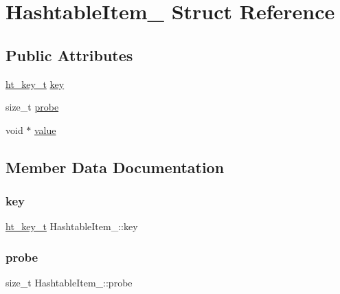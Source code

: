 \hypertarget{structHashtableItem__}{}\section{Hashtable\+Item\+\_\+ Struct Reference}
\label{structHashtableItem__}
\subsection*{Public Attributes}
\begin{DoxyCompactItemize}
\item 
\hyperlink{Hashtable_8h_ac88d0518f664d4d4d74b5a1aa3453de3}{ht\+\_\+key\+\_\+t} \hyperlink{structHashtableItem___a432a2f1c644bb64e759db481280c3f1e}{key}
\item 
size\+\_\+t \hyperlink{structHashtableItem___a35911ac576cf15c4a49f93acf4b38763}{probe}
\item 
void $\ast$ \hyperlink{structHashtableItem___a986e8fbd4a7b4de6c81d0593c6ea39f2}{value}
\end{DoxyCompactItemize}


\subsection{Member Data Documentation}
\mbox{\label{structHashtableItem___a432a2f1c644bb64e759db481280c3f1e}} 
\subsubsection{\texorpdfstring{key}{key}}
{\footnotesize\ttfamily \hyperlink{Hashtable_8h_ac88d0518f664d4d4d74b5a1aa3453de3}{ht\+\_\+key\+\_\+t} Hashtable\+Item\+\_\+\+::key}

\mbox{\label{structHashtableItem___a35911ac576cf15c4a49f93acf4b38763}} 
\subsubsection{\texorpdfstring{probe}{probe}}
{\footnotesize\ttfamily size\+\_\+t Hashtable\+Item\+\_\+\+::probe}

\mbox{\label{structHashtableItem___a986e8fbd4a7b4de6c81d0593c6ea39f2}} 
